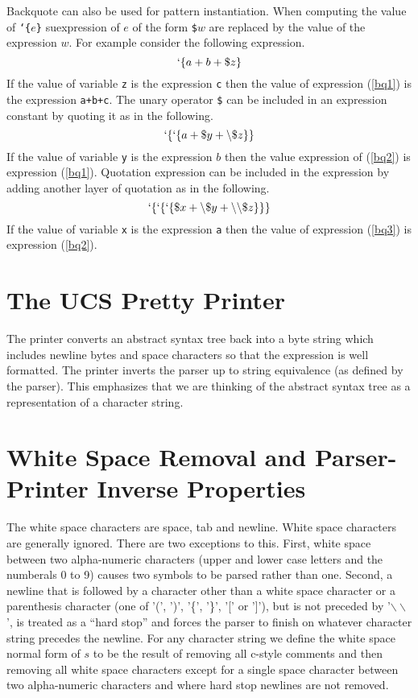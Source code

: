 \documentclass{article}
\newcommand{\mtt}[1]{\mbox{\tt #1}}
\begin{document}
Backquote can also be used for pattern instantiation.
When computing the value of \mtt{`\{$e$\}} suexpression of $e$ of the form \mtt{\$$w$} are replaced by the value of the expression $w$.
For example consider the following expression.
\begin{equation}
\label{bq1}
`\{a+b+\$z\}
\end{equation}
If the value of variable \mtt{z} is the expression \mtt{c} then the value of expression (\ref{bq1}) is the expression \mtt{a+b+c}.
The unary operator \mtt{\$} can be included in an expression constant by quoting it as in the following.
\begin{equation}
\label{bq2}
`\{`\{a + \$y + \backslash\$z\}\}
\end{equation}
If the value of variable \mtt{y} is the expression $b$ then the value expression of (\ref{bq2}) is expression (\ref{bq1}).
Quotation expression can be included in the expression by adding another layer of quotation as in the following.
\begin{equation}
\label{bq3}
`\{`\{`\{\$x + \backslash\$y + \backslash\backslash\$z\}\}\}
\end{equation}
If the value of variable \mtt{x} is the expression \mtt{a} then the value of expression (\ref{bq3}) is expression (\ref{bq2}).


\section{The UCS Pretty Printer}

The printer converts an abstract syntax tree back into a byte string which includes newline bytes and space characters
so that the expression is well formatted. The printer inverts the parser up to string equivalence (as defined by the parser).
This emphasizes that we are thinking of the abstract syntax tree as a representation of a character string.

\section{White Space Removal and Parser-Printer Inverse Properties}

The white space characters are space, tab and newline.  White space characters are generally ignored.  There are two exceptions to this.
First, white space between two alpha-numeric characters (upper and lower case letters and the numberals 0 to 9) causes two symbols to be parsed rather than one.
Second, a newline that is followed by a character other than a white space character or a parenthesis character (one of '(', ')', '\{', '\}', '[' or ']'), but is not preceded by '$\backslash\backslash$', is
treated as a ``hard stop''
and forces the parser to finish on whatever character string precedes the newline.
For any character string we define the white space normal form of $s$
to be the result of removing all c-style comments and then removing all white space characters except for
a single space character between two alpha-numeric characters and where hard stop newlines
are not removed.
\end{document}
